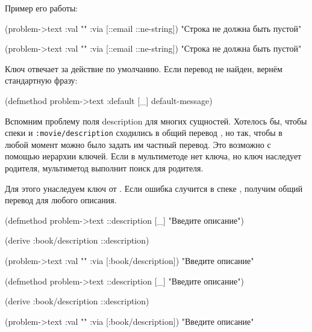 \noindent
Пример его работы:

\ifnarrow

\begin{clojure}
(problem->text
  {:val "" :via [::email ::ne-string]})
"Строка не должна быть пустой"
\end{clojure}

\else

\begin{clojure}
(problem->text {:val "" :via [::email ::ne-string]})
"Строка не должна быть пустой"
\end{clojure}

\fi

Ключ  отвечает за действие по умолчанию. Если перевод не
найден, вернём стандартную фразу:

\begin{clojure}
(defmethod problem->text :default [_]
  default-message)
\end{clojure}


Вспомним проблему поля description для многих сущностей. Хотелось бы, чтобы
спеки  и \texttt{:movie/\-descrip\-tion} сходились в общий
перевод , но так, чтобы в любой момент можно было задать им
частный перевод. Это возможно с помощью иерархии ключей. Если в мультиметоде нет
ключа, но ключ наследует родителя, мультиметод выполнит поиск для родителя.

Для этого унаследуем ключ  от
. Если ошибка случится в спеке ,
получим общий перевод для любого описания.


\ifnarrow

\begin{clojure}
(defmethod problem->text
  ::description [_] "Введите описание")

(derive :book/description ::description)

(problem->text
  {:val "" :via [:book/description]})
"Введите описание"
\end{clojure}

\else

\begin{clojure}
(defmethod problem->text ::description [_]
  "Введите описание")

(derive :book/description ::description)

(problem->text {:val "" :via [:book/description]})
"Введите описание"
\end{clojure}

